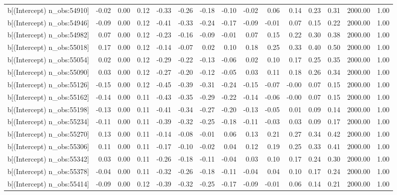 \begin{table}[ht]
\begin{tabular}{rrrrrrrrrrrrrrr}
  b[(Intercept) n\_obs:54910] & -0.02 & 0.00 & 0.12 & -0.33 & -0.26 & -0.18 & -0.10 & -0.02 & 0.06 & 0.14 & 0.23 & 0.31 & 2000.00 & 1.00 \\ 
  b[(Intercept) n\_obs:54946] & -0.09 & 0.00 & 0.12 & -0.41 & -0.33 & -0.24 & -0.17 & -0.09 & -0.01 & 0.07 & 0.15 & 0.22 & 2000.00 & 1.00 \\ 
  b[(Intercept) n\_obs:54982] & 0.07 & 0.00 & 0.12 & -0.23 & -0.16 & -0.09 & -0.01 & 0.07 & 0.15 & 0.22 & 0.30 & 0.38 & 2000.00 & 1.00 \\ 
  b[(Intercept) n\_obs:55018] & 0.17 & 0.00 & 0.12 & -0.14 & -0.07 & 0.02 & 0.10 & 0.18 & 0.25 & 0.33 & 0.40 & 0.50 & 2000.00 & 1.00 \\ 
  b[(Intercept) n\_obs:55054] & 0.02 & 0.00 & 0.12 & -0.29 & -0.22 & -0.13 & -0.06 & 0.02 & 0.10 & 0.17 & 0.25 & 0.35 & 2000.00 & 1.00 \\ 
  b[(Intercept) n\_obs:55090] & 0.03 & 0.00 & 0.12 & -0.27 & -0.20 & -0.12 & -0.05 & 0.03 & 0.11 & 0.18 & 0.26 & 0.34 & 2000.00 & 1.00 \\ 
  b[(Intercept) n\_obs:55126] & -0.15 & 0.00 & 0.12 & -0.45 & -0.39 & -0.31 & -0.24 & -0.15 & -0.07 & -0.00 & 0.07 & 0.15 & 2000.00 & 1.00 \\ 
  b[(Intercept) n\_obs:55162] & -0.14 & 0.00 & 0.11 & -0.43 & -0.35 & -0.29 & -0.22 & -0.14 & -0.06 & -0.00 & 0.07 & 0.15 & 2000.00 & 1.00 \\ 
  b[(Intercept) n\_obs:55198] & -0.13 & 0.00 & 0.11 & -0.41 & -0.34 & -0.27 & -0.20 & -0.13 & -0.05 & 0.01 & 0.09 & 0.14 & 2000.00 & 1.00 \\ 
  b[(Intercept) n\_obs:55234] & -0.11 & 0.00 & 0.11 & -0.39 & -0.32 & -0.25 & -0.18 & -0.11 & -0.03 & 0.03 & 0.09 & 0.17 & 2000.00 & 1.00 \\ 
  b[(Intercept) n\_obs:55270] & 0.13 & 0.00 & 0.11 & -0.14 & -0.08 & -0.01 & 0.06 & 0.13 & 0.21 & 0.27 & 0.34 & 0.42 & 2000.00 & 1.00 \\ 
  b[(Intercept) n\_obs:55306] & 0.11 & 0.00 & 0.11 & -0.17 & -0.10 & -0.02 & 0.04 & 0.12 & 0.19 & 0.25 & 0.33 & 0.41 & 2000.00 & 1.00 \\ 
  b[(Intercept) n\_obs:55342] & 0.03 & 0.00 & 0.11 & -0.26 & -0.18 & -0.11 & -0.04 & 0.03 & 0.10 & 0.17 & 0.24 & 0.30 & 2000.00 & 1.00 \\ 
  b[(Intercept) n\_obs:55378] & -0.04 & 0.00 & 0.11 & -0.32 & -0.26 & -0.18 & -0.11 & -0.04 & 0.04 & 0.10 & 0.17 & 0.24 & 2000.00 & 1.00 \\ 
  b[(Intercept) n\_obs:55414] & -0.09 & 0.00 & 0.12 & -0.39 & -0.32 & -0.25 & -0.17 & -0.09 & -0.01 & 0.06 & 0.14 & 0.21 & 2000.00 & 1.00 \\ 

\end{tabular}
\end{table}
